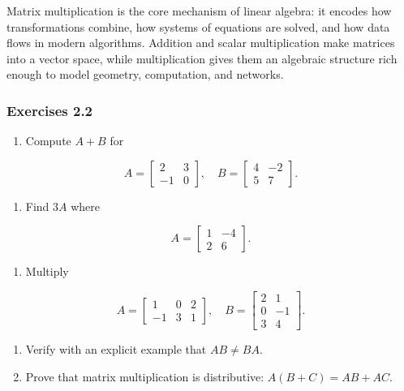 \documentclass[
  12pt,
  a4paper,
]{article}
\begin{document}
Matrix multiplication is the core mechanism of linear algebra: it
encodes how transformations combine, how systems of equations are
solved, and how data flows in modern algorithms. Addition and scalar
multiplication make matrices into a vector space, while multiplication
gives them an algebraic structure rich enough to model geometry,
computation, and networks.

\subsubsection{Exercises 2.2}\label{exercises-22}

\begin{enumerate}
\def\labelenumi{\arabic{enumi}.}
\item
  Compute \(A+B\) for
\end{enumerate}

\[A = \begin{bmatrix} 2 & 3 \\ -1 & 0 \end{bmatrix}, \quad
B = \begin{bmatrix} 4 & -2 \\ 5 & 7 \end{bmatrix}.\]

\begin{enumerate}
\def\labelenumi{\arabic{enumi}.}
\item
  Find \(3A\) where
\end{enumerate}

\[A = \begin{bmatrix} 1 & -4 \\ 2 & 6 \end{bmatrix}.\]

\begin{enumerate}
\def\labelenumi{\arabic{enumi}.}
\item
  Multiply
\end{enumerate}

\[A = \begin{bmatrix} 1 & 0 & 2 \\ -1 & 3 & 1 \end{bmatrix}, \quad
B = \begin{bmatrix} 2 & 1 \\ 0 & -1 \\ 3 & 4 \end{bmatrix}.\]

\begin{enumerate}
\def\labelenumi{\arabic{enumi}.}
\item
  Verify with an explicit example that \(AB \neq BA\).
\item
  Prove that matrix multiplication is distributive:
  \(A(B+C) = AB + AC\).
\end{enumerate}
\end{document}

